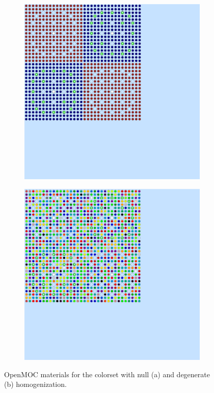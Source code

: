 \begin{figure}[h!]
\centering
\begin{subfigure}{0.42\textwidth}
  \centering
  \includegraphics[width=0.8\linewidth]{figures/reflector/geometry}
  \caption{}
  \label{fig:null-reflector}
\end{subfigure}
\begin{subfigure}{0.42\textwidth}
  \centering
  \includegraphics[width=0.8\linewidth]{figures/reflector/degenerate-materials}
  \caption{}
  \label{fig:degenerate-reflector}
\end{subfigure}
\caption{OpenMOC materials for the colorset with null (a) and degenerate (b) homogenization.}
\label{fig:benchmarks}
\end{figure}

